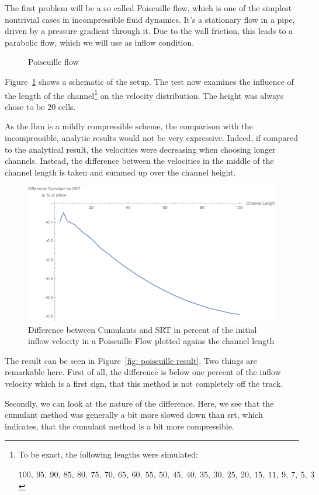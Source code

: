 The first problem will be a so called Poiseuille flow, which is one of the simplest nontrivial cases in incompressible fluid dynamics.
It's a stationary flow in a pipe, driven by a pressure gradient through it.
Due to the wall friction, this leads to a parabolic flow, which we will use as inflow condition.

\begin{figure}
  \centering
  
  \caption{Poiseuille flow}
\label{fig: poiseuille}
\end{figure}

Figure~\ref{fig: poiseuille} shows a schematic of the setup.
The test now examines the influence of the length of the channel\footnote{To be exact, the following lengths were simulated:\par
 $100,\ 95,\ 90,\ 85,\ 80,\ 75,\ 70,\ 65,\ 60,\ 55,\ 50,\ 45,\ 40,\ 35,\ 30,\ 25,\ 20,\ 15,\ 11,\ 9,\ 7,\ 5,\ 3$
} on the velocity distribution.
The height was always chose to be $20$ cells.

As the \gls{lbm} is a mildly compressible scheme, the comparison with the incompressible, analytic results would not be very expressive.
Indeed, if compared to the analytical result, the velocities were decreasing when choosing longer channels.
Instead, the difference between the velocities in the middle of the channel length is taken and summed up over the channel height.

\begin{figure}
  \centering
  \includegraphics[width=0.8\linewidth]{../figures/poiseuille.pdf} %
  \caption{Difference between Cumulants and SRT in percent of the initial inflow velocity in a Poiseuille Flow plotted agains the channel length}
\label{fig: poiseuille result}
\end{figure}

The result can be seen in Figure~\eqref{fig: poiseuille result}.
Two things are remarkable here.
First of all, the difference is below one percent of the inflow velocity which is a first sign, that this method is not completely off the track.

Secondly, we can look at the nature of the difference.
Here, we see that the cumulant method was generally a bit more slowed down than \gls{srt}, which indicates, that the cumulant method is a bit more compressible.

